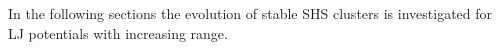 In the following sections the evolution of stable \ac{SHS} clusters is
investigated for \ac{LJ} potentials with increasing range. 




